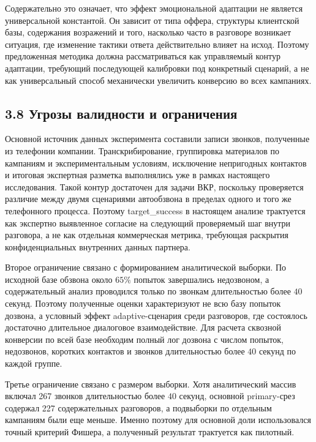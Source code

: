 \documentclass[a4paper,14pt]{extarticle}
\renewcommand{\texttt}[1]{\textnormal{#1}}
\begin{document}
Содержательно это означает, что эффект эмоциональной адаптации не
является универсальной константой. Он зависит от типа оффера, структуры
клиентской базы, содержания возражений и того, насколько часто в
разговоре возникает ситуация, где изменение тактики ответа действительно
влияет на исход. Поэтому предложенная методика должна рассматриваться
как управляемый контур адаптации, требующий последующей калибровки под
конкретный сценарий, а не как универсальный способ механически увеличить
конверсию во всех кампаниях.

\subsection{3.8 Угрозы валидности и
ограничения}\label{ux443ux433ux440ux43eux437ux44b-ux432ux430ux43bux438ux434ux43dux43eux441ux442ux438-ux438-ux43eux433ux440ux430ux43dux438ux447ux435ux43dux438ux44f}

Основной источник данных эксперимента составили записи звонков,
полученные из телефонии компании. Транскрибирование, группировка
материалов по кампаниям и экспериментальным условиям, исключение
непригодных контактов и итоговая экспертная разметка выполнялись уже в
рамках настоящего исследования. Такой контур достаточен для задачи ВКР,
поскольку проверяется различие между двумя сценариями автообзвона в
пределах одного и того же телефонного процесса. Поэтому
\texttt{target\_\allowbreak{}success} в настоящем анализе трактуется как экспертно
выявленное согласие на следующий проверяемый шаг внутри разговора, а не
как отдельная коммерческая метрика, требующая раскрытия конфиденциальных
внутренних данных партнера.

Второе ограничение связано с формированием аналитической выборки. По
исходной базе обзвона около \(65\%\) попыток завершались недозвоном, а
содержательный анализ проводился только по звонкам длительностью более
\(40\) секунд. Поэтому полученные оценки характеризуют не всю базу
попыток дозвона, а условный эффект adaptive-сценария среди разговоров,
где состоялось достаточно длительное диалоговое взаимодействие. Для
расчета сквозной конверсии по всей базе необходим полный лог дозвона с
числом попыток, недозвонов, коротких контактов и звонков длительностью
более \(40\) секунд по каждой группе.

Третье ограничение связано с размером выборки. Хотя аналитический массив
включал 267 звонков длительностью более \(40\) секунд, основной
primary-срез содержал 227 содержательных разговоров, а подвыборки по
отдельным кампаниям были еще меньше. Именно поэтому для основной доли
использовался точный критерий Фишера, а полученный результат трактуется
как пилотный.
\end{document}
